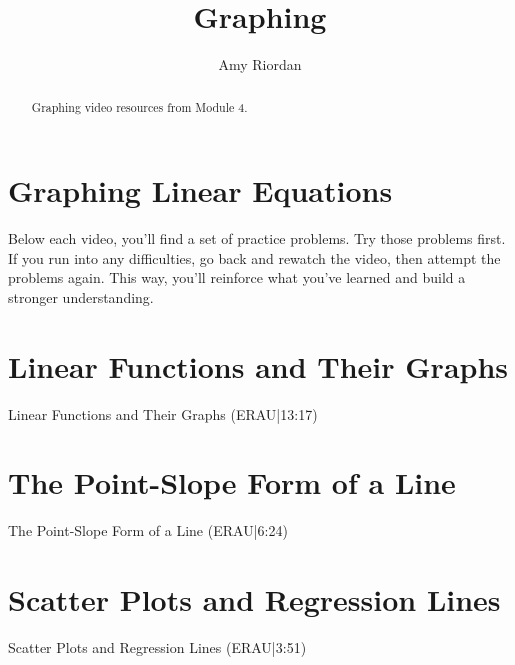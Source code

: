 \documentclass{ximera}
\title{Graphing}
\author{Amy Riordan}
\begin{document}
\begin{abstract}
Graphing video resources from Module 4.
\end{abstract}
\maketitle

\section*{Graphing Linear Equations}

Below each video, you’ll find a set of practice problems. Try those problems first. If you run into any difficulties, go back and rewatch the video, then attempt the problems again. This way, you’ll reinforce what you’ve learned and build a stronger understanding.

\section*{Linear Functions and Their Graphs}

Linear Functions and Their Graphs (ERAU|13:17)




\section*{The Point-Slope Form of a Line}

The Point-Slope Form of a Line (ERAU|6:24)




\section*{Scatter Plots and Regression Lines}

Scatter Plots and Regression Lines (ERAU|3:51)

\end{document}
